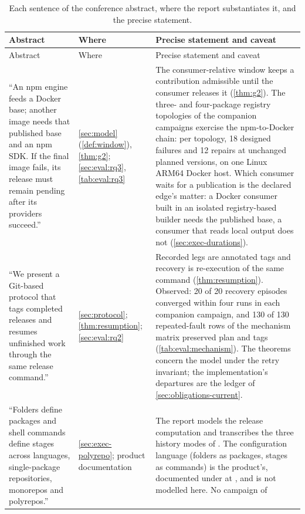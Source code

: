 \begin{center}
\small
\begin{longtable}{@{}L{4.3cm}L{2.5cm}L{7.3cm}@{}}
\caption{Each sentence of the conference abstract, where the report
substantiates it, and the precise statement.}
\label{tab:abstract-map}\\
\toprule
Abstract & Where & Precise statement and caveat \\
\midrule
\endfirsthead
\toprule
Abstract & Where & Precise statement and caveat \\
\midrule
\endhead
``An npm engine feeds a Docker base; another image needs that published base
and an npm SDK. If the final image fails, its release must remain pending
after its providers succeed.'' & \cref{sec:model} (\cref{def:window}),
\cref{thm:g2}; \cref{sec:eval:rq3}, \cref{tab:eval:rq3} & The
consumer-relative window keeps a contribution admissible until the consumer
releases it (\cref{thm:g2}). The three- and four-package registry topologies
of the companion campaigns exercise the npm-to-Docker chain: per topology, 18
designed failures and 12 repairs at unchanged planned versions, on one Linux
ARM64 Docker host. Which consumer waits for a publication is the declared
edge's matter: a Docker consumer built in an isolated registry-based builder
needs the published base, a consumer that reads local output does not
(\cref{sec:exec-durations}). \\
``We present a Git-based protocol that tags completed releases and resumes
unfinished work through the same release command.'' & \cref{sec:protocol};
\cref{thm:resumption}; \cref{sec:eval:rq2} & Recorded legs are annotated tags
and recovery is re-execution of the same command (\cref{thm:resumption}).
Observed: 20 of 20 recovery episodes converged within four runs in each
companion campaign, and 130 of 130 repeated-fault rows of the mechanism matrix
preserved plan and tags (\cref{tab:eval:mechanism}). The theorems concern the
model under the retry invariant; the implementation's departures are the
ledger of \cref{sec:obligations-current}. \\
``Folders define packages and shell commands define stages across languages,
single-package repositories, monorepos and polyrepos.'' &
\cref{sec:exec-polyrepo}; product documentation & The report models the
release computation and transcribes the three history modes of . The
configuration language (folders as packages, stages as commands) is the
product's, documented under  at
, and is not modelled here. No campaign of

\end{longtable}
\end{center}
